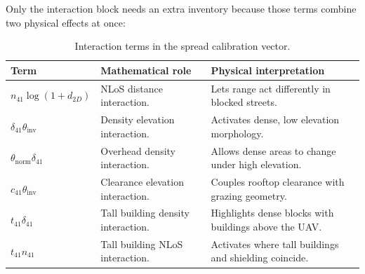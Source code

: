Only the interaction block needs an extra inventory because those terms combine
two physical effects at once:

\begin{table}[!htbp]
\centering
\caption{Interaction terms in the spread calibration vector.}
\label{tab:spread_interaction_inventory}
\scriptsize
\setlength{\tabcolsep}{2.5pt}
\renewcommand{\arraystretch}{0.88}
\begin{tabularx}{\textwidth}{p{3.0cm} p{3.2cm} X}
\toprule
\textbf{Term} & \textbf{Mathematical role} & \textbf{Physical interpretation} \\
\midrule
\(n_{41}\log(1+d_{2D})\) & NLoS distance interaction. & Lets range act differently in blocked streets. \\
\(\delta_{41}\theta_{\mathrm{inv}}\) & Density elevation interaction. & Activates dense, low elevation morphology. \\
\(\theta_{\mathrm{norm}}\delta_{41}\) & Overhead density interaction. & Allows dense areas to change under high elevation. \\
\(c_{41}\theta_{\mathrm{inv}}\) & Clearance elevation interaction. & Couples rooftop clearance with grazing geometry. \\
\(t_{41}\delta_{41}\) & Tall building density interaction. & Highlights dense blocks with buildings above the UAV. \\
\(t_{41}n_{41}\) & Tall building NLoS interaction. & Activates where tall buildings and shielding coincide. \\
\bottomrule
\end{tabularx}
\end{table}

